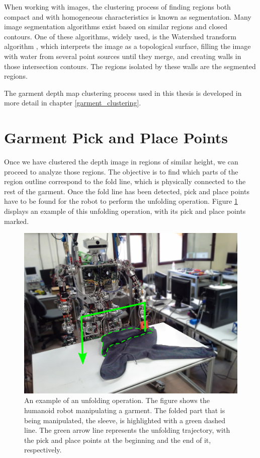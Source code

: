 When working with images, the clustering process of finding regions both compact and with homogeneous characteristics is known as segmentation. Many image segmentation algorithms exist based on similar regions and closed contours. One of these algorithms, widely used, is the Watershed transform algorithm \cite{digabel1978iterative}, which interprets the image as a topological surface, filling the image with water from several point sources until they merge, and creating walls in those intersection contours. The regions isolated by these walls are the segmented regions.

The garment depth map clustering process used in this thesis is developed in more detail in chapter \ref{garment_clustering}.

\section{Garment Pick and Place Points}
\label{garment_PnP_points}

Once we have clustered the depth image in regions of similar height, we can proceed to analyze those regions. The objective is to find which parts of the region outline correspond to the fold line, which is physically connected to the rest of the garment. Once the fold line has been detected, pick and place points have to be found for the robot to perform the unfolding operation. Figure \ref{fig:picking_points} displays an example of this unfolding operation, with its pick and place points marked.

\begin{figure}[thpb]
    \centering
    \includegraphics[width=0.8
    \textwidth]{figures/teo-pick-and-place.pdf}
    \caption{An example of an unfolding operation. The figure shows the humanoid robot manipulating a garment. The folded part that is being manipulated, the sleeve, is highlighted with a green dashed line. The green arrow line represents the unfolding trajectory, with the pick and place points at the beginning and the end of it, respectively.}
    \label{fig:picking_points}
\end{figure}


